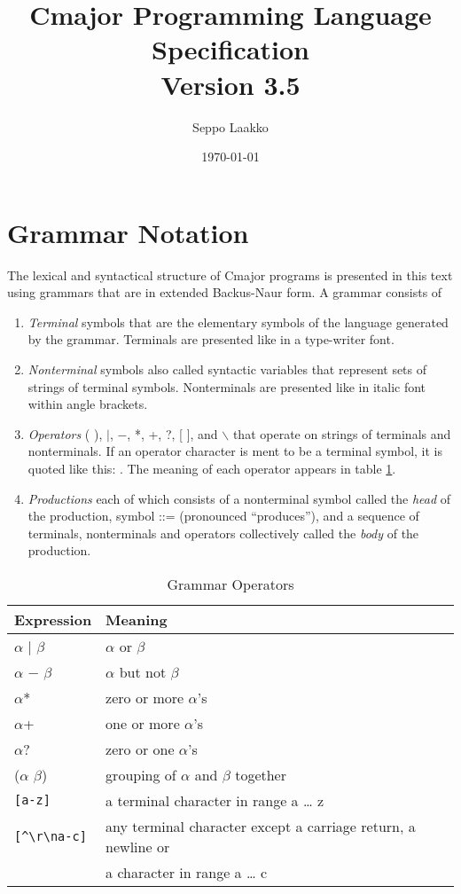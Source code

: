 \documentclass[a4paper,oneside,11pt]{article}
\begin{document}
\title{Cmajor Programming Language Specification\\Version 3.5}
\author{Seppo Laakko}
\date{\today}
\maketitle
\tableofcontents

\clearpage

\section{Grammar Notation}

The lexical and syntactical structure of Cmajor programs is presented in this text
using grammars that are in extended Backus-Naur form.
A grammar consists of

\begin{enumerate}
\item
\emph{Terminal} symbols that are the elementary symbols of the language generated by the grammar.
Terminals are presented like  in a type-writer font.
\item
\emph{Nonterminal} symbols also called syntactic variables that represent sets of strings of terminal symbols.
Nonterminals are presented like  in italic font within angle brackets.
\item
\emph{Operators} ( ), $|$, $-$, *, +, ?, [ ], and $\backslash$ that operate on strings of terminals and nonterminals.
If an operator character is ment to be a terminal symbol, it is quoted like this: \lit{*}.
The meaning of each operator appears in table \ref{tab:operators}.
\item
\emph{Productions} each of which consists of a nonterminal symbol called the \emph{head} of the production, symbol ::= (pronounced ``produces''), and
a sequence of terminals, nonterminals and operators collectively called the \emph{body} of the production.
\end{enumerate}

\begin{table}[htb]
\caption{Grammar Operators}\label{tab:operators}
\begin{tabular}{ll}
\bf{Expression}& \bf{Meaning}\\
\hline
$\alpha$ $|$ $\beta$ & $\alpha$ or $\beta$\\
$\alpha$ $-$ $\beta$ & $\alpha$ but not $\beta$\\
$\alpha$* & zero or more $\alpha$'s\\
$\alpha$+ & one or more $\alpha$'s\\
$\alpha$? & zero or one $\alpha$'s\\
($\alpha$ $\beta$) & grouping of $\alpha$ and $\beta$ together\\
\verb|[a-z]| & a terminal character in range a \ldots{} z\\
\verb|[^\r\na-c]| & any terminal character except a carriage return, a newline or\\& a character in range a \ldots{} c\\
\end{tabular}
\end{table}
\end{document}
